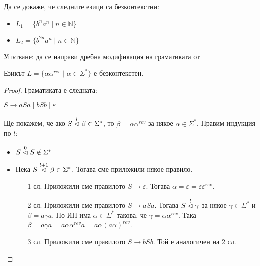 \begin{problem}
Да се докаже, че следните езици са безконтекстни:
\begin{itemize}
    \item $L_1 = \{ b^na^n \mid n \in \mathbb{N} \}$
    \item $L_2 = \{ b^{2n}a^n \mid n \in \mathbb{N} \}$
\end{itemize}
Упътване: да се направи дребна модификация на граматиката от 
\end{problem}

\begin{claim}
    Езикът $L = \{ \alpha \alpha^{rev} \mid \alpha \in \Sigma^* \}$ е безконтекстен.
\end{claim}

\begin{proof}
    Граматиката е следната:
    \begin{center}
        $S \rightarrow aSa \mid bSb \mid \varepsilon$
    \end{center}

    Ще покажем, че ако $S \stackrel{l}{\vartriangleleft} \beta \in \Sigma^*$, то $\beta = \alpha \alpha^{rev}$ за някое $\alpha \in \Sigma^*$.
    Правим индукция по $l$:
    \begin{itemize}
        \item $S \stackrel{0}{\vartriangleleft} S \notin \Sigma^*$ \checkmark
        \item Нека $S \stackrel{l + 1}{\vartriangleleft} \beta \in \Sigma^*$.
              Тогава сме приложили някое правило.
              \begin{itemize}
                  \item[1 сл.] Приложили сме правилото $S \rightarrow \varepsilon$.
                      Тогава $\alpha = \varepsilon = \varepsilon \varepsilon^{rev}$.
                  \item[2 сл.] Приложили сме правилото $S \rightarrow aSa$.
                      Тогава $S \stackrel{l}{\vartriangleleft} \gamma$ за някое $\gamma \in \Sigma^*$ и $\beta = a \gamma a$.
                      По ИП има $\alpha \in \Sigma^*$ такова, че $\gamma = \alpha \alpha^{rev}$.
                      Така $\beta = a \gamma a = a \alpha \alpha^{rev} a = a \alpha (a \alpha)^{rev}$.
                  \item[3 сл.] Приложили сме правилото $S \rightarrow bSb$.
                      Той е аналогичен на 2 сл.
              \end{itemize}
    \end{itemize}


\end{proof}
